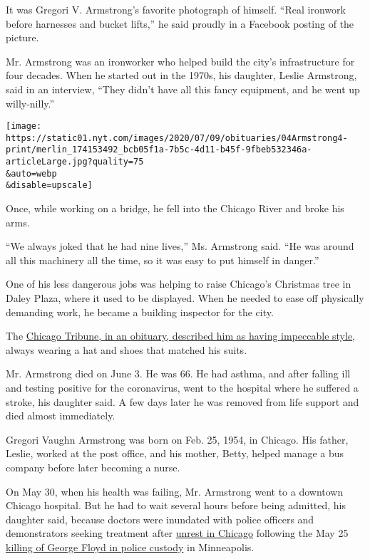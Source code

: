 It was Gregori V. Armstrong's favorite photograph of himself. ``Real
ironwork before harnesses and bucket lifts,'' he said proudly in a
Facebook posting of the picture.

Mr. Armstrong was an ironworker who helped build the city's
infrastructure for four decades. When he started out in the 1970s, his
daughter, Leslie Armstrong, said in an interview, ``They didn't have all
this fancy equipment, and he went up willy-nilly.''

\texttt{[image: https://static01.nyt.com/images/2020/07/09/obituaries/04Armstrong4-print/merlin\_174153492\_bcb05f1a-7b5c-4d11-b45f-9fbeb532346a-articleLarge.jpg?quality=75\\\&auto=webp\\\&disable=upscale]}

Once, while working on a bridge, he fell into the Chicago River and
broke his arms.

``We always joked that he had nine lives,'' Ms. Armstrong said. ``He was
around all this machinery all the time, so it was easy to put himself in
danger.''

One of his less dangerous jobs was helping to raise Chicago's Christmas
tree in Daley Plaza, where it used to be displayed. When he needed to
ease off physically demanding work, he became a building inspector for
the city.

The
\href{https://graphics.chicagotribune.com/coronavirus-lives-lost/blurb.html}{Chicago
Tribune, in an obituary, described him as having impeccable style},
always wearing a hat and shoes that matched his suits.

Mr. Armstrong died on June 3. He was 66. He had asthma, and after
falling ill and testing positive for the coronavirus, went to the
hospital where he suffered a stroke, his daughter said. A few days later
he was removed from life support and died almost immediately.

Gregori Vaughn Armstrong was born on Feb. 25, 1954, in Chicago. His
father, Leslie, worked at the post office, and his mother, Betty, helped
manage a bus company before later becoming a nurse.

On May 30, when his health was failing, Mr. Armstrong went to a downtown
Chicago hospital. But he had to wait several hours before being
admitted, his daughter said, because doctors were inundated with police
officers and demonstrators seeking treatment after
\href{https://news.wttw.com/2020/06/29/371-complaints-lodged-about-chicago-police-response-protests}{unrest
in Chicago} following the May 25
\href{https://www.nytimes.com/video/us/100000007159353/george-floyd-arrest-death-video.html}{killing
of George Floyd in police custody} in Minneapolis.

